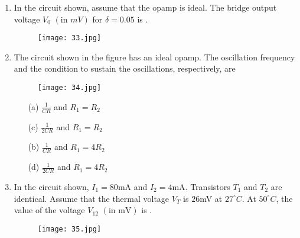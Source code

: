 \documentclass[12pt,-letter paper]{article}
\providecommand{\brak}[1]{\ensuremath{\left(#1\right)}}
\theoremstyle{remark}
\begin{document}
\begin{enumerate}
 \item In the circuit shown, assume that the opamp is ideal. The bridge output voltage $V_0$ \brak{\text{in $mV$}} for $\delta=0.05$ is \underline{\hspace{1cm}}.
    \begin{figure}[H]
        \centering
        \texttt{[image: 33.jpg]}
    \end{figure}
 \item The circuit shown in the figure has an ideal opamp. The oscillation frequency and the condition to sustain the oscillations, respectively, are
   \begin{figure}[H]
        \centering
        \texttt{[image: 34.jpg]}
    \end{figure}
    \begin{minipage}[t]{.5\textwidth}
    \begin{itemize}
        \item[(a)] $\frac{1}{CR}$ and $R_1=R_2$
        \item[(c)] $\frac{1}{2CR}$ and $R_1=R_2$
    \end{itemize}
    \end{minipage}
    \hfill %
    \begin{minipage}[t]{.5\textwidth}
    \begin{itemize}
        \item[(b)] $\frac{1}{CR}$ and $R_1=4R_2$
        \item[(d)] $\frac{1}{2CR}$ and $R_1=4R_2$
    \end{itemize}
    \end{minipage}
 \item In the circuit shown, $I_1 = 80$mA and $I_2 = 4$mA. Transistors $T_1$ and $T_2$ are identical. Assume that the thermal voltage $V_T$ is $26$mV at $27^\circ C$. At $50^\circ C$, the value of the voltage $V_12$ \brak{\text{in mV}} is \underline{\hspace{2cm}}.
    \begin{figure}[H]
        \centering
        \texttt{[image: 35.jpg]}
    \end{figure}


\end{enumerate}
\end{document}

